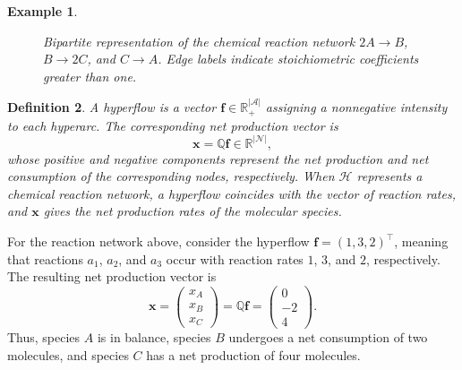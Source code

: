 \documentclass[a4paper,11pt,reqno]{amsart}
\newtheorem{definition}{Definition}[section]
\newtheorem{example}[definition]{Example}
\begin{document}
\begin{example}
\begin{figure}[ht]
\caption{Bipartite representation of the chemical reaction network $2A\to B$, $B\to 2C$, and $C\to A$. Edge labels indicate
stoichiometric coefficients greater than one.}
\label{fig:bipartite-crn}
\end{figure}
\end{example}
\begin{definition}
A \emph{hyperflow} is a vector
$\mathbf{f}\in\mathbb{R}_{+}^{|\mathcal{A}|}$ assigning a nonnegative
intensity to each hyperarc. The corresponding net production vector is
$$
\mathbf{x}=\mathbb{Q}\mathbf{f}\in\mathbb{R}^{|\mathcal{N}|},
$$
whose positive and negative components represent the net production and net
consumption of the corresponding nodes, respectively. When
$\mathcal{H}$ represents a chemical reaction network, a hyperflow coincides
with the vector of reaction rates, and $\mathbf{x}$ gives the net production
rates of the molecular species.
\end{definition}

For the reaction network above, consider the hyperflow
$\mathbf{f}=(1,3,2)^\top$, meaning that reactions $a_1$, $a_2$, and $a_3$
occur with reaction rates $1$, $3$, and $2$, respectively. The resulting net
production vector is
$$
\mathbf{x}=
\begin{pmatrix}
x_A\\
x_B\\
x_C
\end{pmatrix}
=
\mathbb{Q}\mathbf{f}
=
\begin{pmatrix}
0\\
-2\\
4
\end{pmatrix}.
$$
Thus, species $A$ is in balance, species $B$ undergoes a net consumption of
two molecules, and species $C$ has a net production of four molecules.
\end{document}
